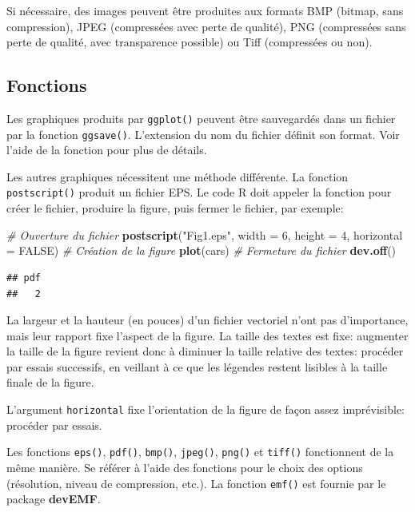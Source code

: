 \documentclass[
  12pt,
  french,
  a4paper,
  extrafontsizes,onecolumn,openright
  ]{memoir}
\newenvironment{Shaded}{\begin{snugshade}}{\end{snugshade}}
\newcommand{\AttributeTok}[1]{\textcolor[rgb]{0.13,0.29,0.53}{#1}}
\newcommand{\CommentTok}[1]{\textcolor[rgb]{0.56,0.35,0.01}{\textit{#1}}}
\newcommand{\ConstantTok}[1]{\textcolor[rgb]{0.56,0.35,0.01}{#1}}
\newcommand{\DecValTok}[1]{\textcolor[rgb]{0.00,0.00,0.81}{#1}}
\newcommand{\FunctionTok}[1]{\textcolor[rgb]{0.13,0.29,0.53}{\textbf{#1}}}
\newcommand{\NormalTok}[1]{#1}
\newcommand{\StringTok}[1]{\textcolor[rgb]{0.31,0.60,0.02}{#1}}
\begin{document}
Si nécessaire, des images peuvent être produites aux formats BMP (bitmap, sans compression), JPEG (compressées avec perte de qualité), PNG (compressées sans perte de qualité, avec transparence possible) ou Tiff (compressées ou non).

\subsection{Fonctions}\label{fonctions}

Les graphiques produits par \texttt{ggplot()} peuvent être sauvegardés dans un fichier par la fonction \texttt{ggsave()}.
L'extension du nom du fichier définit son format.
Voir l'aide de la fonction pour plus de détails.

Les autres graphiques nécessitent une méthode différente.
La fonction \texttt{postscript()} produit un fichier EPS.
Le code R doit appeler la fonction pour créer le fichier, produire la figure, puis fermer le fichier, par exemple:

\scriptsize

\begin{Shaded}
\begin{Highlighting}[]
\CommentTok{\# Ouverture du fichier}
\FunctionTok{postscript}\NormalTok{(}\StringTok{"Fig1.eps"}\NormalTok{, }\AttributeTok{width =} \DecValTok{6}\NormalTok{, }\AttributeTok{height =} \DecValTok{4}\NormalTok{, }\AttributeTok{horizontal =} \ConstantTok{FALSE}\NormalTok{)}
\CommentTok{\# Création de la figure}
\FunctionTok{plot}\NormalTok{(cars)}
\CommentTok{\# Fermeture du fichier}
\FunctionTok{dev.off}\NormalTok{()}
\end{Highlighting}
\end{Shaded}

\begin{verbatim}
## pdf 
##   2
\end{verbatim}

\normalsize

La largeur et la hauteur (en pouces) d'un fichier vectoriel n'ont pas d'importance, mais leur rapport fixe l'aspect de la figure.
La taille des textes est fixe: augmenter la taille de la figure revient donc à diminuer la taille relative des textes: procéder par essais successifs, en veillant à ce que les légendes restent lisibles à la taille finale de la figure.

L'argument \texttt{horizontal} fixe l'orientation de la figure de façon assez imprévisible: procéder par essais.

Les fonctions \texttt{eps()}, \texttt{pdf()}, \texttt{bmp()}, \texttt{jpeg()}, \texttt{png()} et \texttt{tiff()} fonctionnent de la même manière.
Se référer à l'aide des fonctions pour le choix des options (résolution, niveau de compression, etc.).
La fonction \texttt{emf()} est fournie par le package \textbf{devEMF}.
\end{document}
